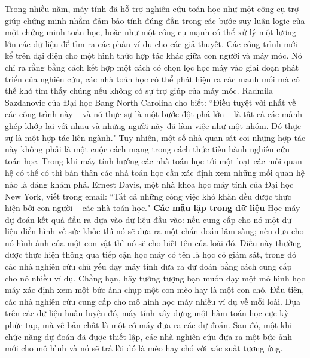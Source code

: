 \begin{multicols}{2}
	\vskip 0.05cm
	Trong nhiều năm, máy tính đã hỗ trợ nghiên cứu toán học như một công cụ trợ giúp chứng minh nhằm đảm bảo tính đúng đắn trong các bước suy luận logic của một chứng minh toán học, hoặc như một công cụ mạnh có thể xử lý một lượng lớn các dữ liệu để tìm ra các phản ví dụ cho các giả thuyết.
	\vskip 0.05cm
	Các công trình mới kể trên đại diện cho một hình thức hợp tác khác giữa con người và máy móc. Nó chỉ ra rằng bằng cách kết hợp một cách có chọn lọc học máy vào giai đoạn phát triển của nghiên cứu, các nhà toán học có thể phát hiện ra các manh mối mà có thể khó tìm thấy chúng nếu không có sự trợ giúp của máy móc.
	\vskip 0.05cm
	Radmila Sazdanovic của Đại học Bang North Carolina cho biết: ``Điều tuyệt vời nhất về các công trình này -- và nó thực sự là một bước đột phá lớn -- là tất cả các mảnh ghép khớp lại với nhau và những người này đã làm việc như một nhóm. Đó thực sự là một hợp tác liên ngành."
	\vskip 0.05cm
	Tuy nhiên, một số nhà quan sát coi những hợp tác này không phải là một cuộc cách mạng trong cách thức tiến hành nghiên cứu toán học. Trong khi máy tính hướng các nhà toán học tới một loạt các mối quan hệ có thể có thì bản thân các nhà toán học cần xác định xem những mối quan hệ nào là đáng khám phá.
	\vskip 0.05cm
	Ernest Davis, một nhà khoa học máy tính của Đại học New York, viết trong email: ``Tất cả những công việc khó khăn đều được thực hiện bởi con người -- các nhà toán học."
	\vskip 0.05cm
	\textbf{\color{duongvaotoanhoc}Các mẫu lặp trong dữ liệu}
	\vskip 0.05cm
	Học máy dự đoán kết quả đầu ra dựa vào dữ liệu đầu vào: nếu cung cấp cho nó một dữ liệu điển hình về sức khỏe thì nó sẽ đưa ra một chẩn đoán lâm sàng; nếu đưa cho nó hình ảnh của một con vật thì nó sẽ cho biết tên của loài đó.
	\vskip 0.05cm
	Điều này thường được thực hiện thông qua tiếp cận học máy có tên là học có giám sát, trong đó các nhà nghiên cứu chủ yếu dạy máy tính đưa ra dự đoán bằng cách cung cấp cho nó nhiều ví dụ.
	\vskip 0.05cm
	Chẳng hạn, hãy tưởng tượng bạn muốn dạy một mô hình học máy xác định xem một bức ảnh chụp một con mèo hay là một con chó. Đầu tiên, các nhà nghiên cứu cung cấp cho mô hình học máy nhiều ví dụ về mỗi loài. Dựa trên các dữ liệu huấn luyện đó, máy tính xây dựng một hàm toán học cực kỳ phức tạp, mà về bản chất là một cỗ máy đưa ra các dự đoán. Sau đó, một khi chức năng dự đoán đã được thiết lập, các nhà nghiên cứu đưa ra một bức ảnh mới cho mô hình và nó sẽ trả lời đó là mèo hay chó với xác suất tương ứng.
	\begin{figure}[H]
		\centering
		\vspace*{-5pt}

\end{figure}
\end{multicols}
